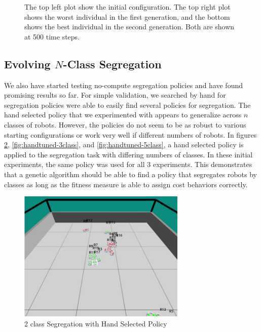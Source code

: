 \documentclass[conference]{IEEEtran}
\begin{document}
\begin{figure}
    \caption{The top left plot show the initial configuration. The top right plot shows the worst individual in the first generation, and the bottom shows the best individual in the second generation. Both are shown at 500 time steps.}
    \label{fig:evolved_aggregation}
  \end{figure}

  \subsection{Evolving $N$-Class Segregation}

  We also have started testing no-compute segregation policies and have found promising results so far. For simple validation, we searched by hand for segregation policies were able to easily find several policies for segregation. The hand selected policy that we experimented with appears to generalize across $n$ classes of robots. However, the policies do not seem to be as robust to various starting configurations or work very well if different numbers of robots. In figures \ref{fig:handtuned-2class}, \ref{fig:handtuned-3class}, and \ref{fig:handtuned-5class}, a hand selected policy is applied to the segregation task with differing numbers of classes. In these initial experiments, the same policy was used for all 3 experiments. This demonstrates that a genetic algorithm should be able to find a policy that segregates robots by classes as long as the fitness measure is able to assign cost behaviors correctly.

  \begin{figure}
    \centering
    \includegraphics[width=8cm]{handtuned-2class.png}
    \caption{2 class Segregation with Hand Selected Policy}
    \label{fig:handtuned-2class}
  \end{figure}
\end{document}
